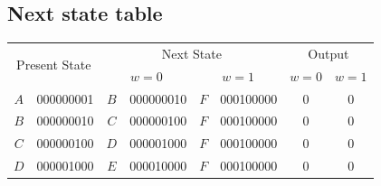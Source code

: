 \documentclass[13pt,a4paper]{report}
\begin{document}
\subsection{Next state table}
\vspace{-0.5cm}
\begin{table}[H]
\centering
\begin{tabular}{cc|cccc|cc}
\multicolumn{2}{c|}{\multirow{2}{*}{Present State}}                                                       & \multicolumn{4}{c|}{Next State}                                                                                                                                                                                      & \multicolumn{2}{c}{Output}                                  \\
\multicolumn{2}{c|}{}                                                                                     & \multicolumn{2}{c}{$w=0$}                                                                                  & \multicolumn{2}{c|}{$w=1$}                                                                                  & $w=0$                          & $w=1  $                        \\ \hline
$A$                          & 000000001                                                                    & $B$                          & 000000010                                                                   & $F$                          & 000100000                                                                    & 0                            & 0                            \\
$B$                          & 000000010                                                                    & $C$                          & 000000100                                                                   & $F$                          & 000100000                                                                    & 0                            & 0                            \\
$C$                          & 000000100                                                                    & $D$                          & 000001000                                                                   & $F$                          & 000100000                                                                    & 0                            & 0                            \\
$D$                          & 000001000                                                                    & $E$                          & 000010000                                                                   & $F$                          & 000100000                                                                    & 0                            & 0                            \\

\end{tabular}
\end{table}
\end{document}

